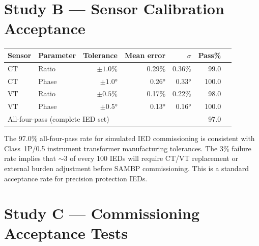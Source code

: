\documentclass[11pt,a4paper]{article}
\begin{document}
\section{Study B --- Sensor Calibration Acceptance}
\label{sec:studyB}

\begin{center}
\begin{tabular}{@{}llrrrrl@{}}
\toprule
Sensor & Parameter & Tolerance & Mean error & $\sigma$ & Pass\% \\
\midrule
CT & Ratio & $\pm1.0\%$ & 0.29\% & 0.36\% & 99.0 \\
CT & Phase & $\pm1.0°$ & 0.26° & 0.33° & 100.0 \\
VT & Ratio & $\pm0.5\%$ & 0.17\% & 0.22\% & 98.0 \\
VT & Phase & $\pm0.5°$ & 0.13° & 0.16° & 100.0 \\
\midrule
\multicolumn{5}{l}{All-four-pass (complete IED set)} & 97.0 \\
\bottomrule
\end{tabular}
\end{center}

\medskip\noindent
The 97.0\% all-four-pass rate for simulated IED commissioning is consistent
with Class~1P/0.5 instrument transformer manufacturing tolerances.  The 3\%
failure rate implies that $\sim$3 of every 100 IEDs will require CT/VT
replacement or external burden adjustment before SAMBP commissioning.  This
is a standard acceptance rate for precision protection IEDs.

\section{Study C --- Commissioning Acceptance Tests}
\label{sec:studyC}
\end{document}
